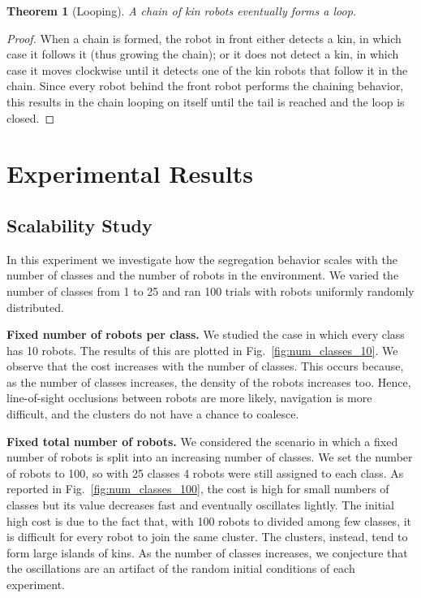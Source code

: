 \documentclass[letterpaper, 10 pt, conference]{ieeeconf}
\newtheorem{theorem}{Theorem}
\newcommand{\myparagraph}[1]{\textbf{#1.}}
\begin{document}
\begin{theorem}[Looping]
  A chain of kin robots eventually forms a loop.
\end{theorem}
\begin{proof}
  When a chain is formed, the robot in front either detects a kin, in which case
  it follows it (thus growing the chain); or it does not detect a kin, in which
  case it moves clockwise until it detects one of the kin robots that follow it
  in the chain. Since every robot behind the front robot performs the chaining
  behavior, this results in the chain looping on itself until the tail is
  reached and the loop is closed.
\end{proof}

\section{Experimental Results}

\subsection{Scalability Study} \label{section:scalability}

In this experiment we investigate how the segregation behavior scales with the
number of classes and the number of robots in the environment. We varied the
number of classes from 1 to 25 and ran 100 trials with robots uniformly randomly
distributed.

\myparagraph{Fixed number of robots per class}
We studied the case in which every class has 10 robots. The results of this are
plotted in Fig.~\ref{fig:num_classes_10}. We observe that the cost increases
with the number of classes. This occurs because, as the number of classes
increases, the density of the robots increases too. Hence, line-of-sight
occlusions between robots are more likely, navigation is more difficult, and the
clusters do not have a chance to coalesce.

\myparagraph{Fixed total number of robots}
We considered the scenario in which a fixed number of robots is split into an
increasing number of classes. We set the number of robots to 100, so with 25
classes 4 robots were still assigned to each class. As reported in
Fig.~\ref{fig:num_classes_100}, the cost is high for small numbers of classes
but its value decreases fast and eventually oscillates lightly. The initial high
cost is due to the fact that, with 100 robots to divided among few classes, it
is difficult for every robot to join the same cluster. The clusters, instead,
tend to form large islands of kins. As the number of classes increases, we
conjecture that the oscillations are an artifact of the random initial
conditions of each experiment.
\end{document}
